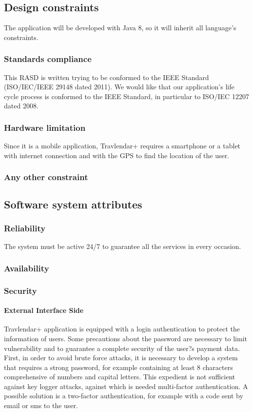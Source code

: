 \documentclass[12pt,titlepage]{article}
\begin{document}
\subsection{Design constraints}\label{sec:mod1}
The application will be developed with Java 8, so it will inherit all language's constraints.

\subsubsection{Standards compliance}\label{sec:mod1}
This RASD is written trying to be conformed to the IEEE Standard (ISO/IEC/IEEE 29148 dated 2011).
We would like that our application's life cycle process is conformed to the IEEE Standard, in particular to ISO/IEC 12207 dated 2008.


\subsubsection{Hardware limitation}\label{sec:mod1}
Since it is a mobile application, Travlendar+ requires a smartphone or a tablet with internet connection and with the GPS to find the location of the user. 

\subsubsection{Any other constraint}\label{sec:mod1}
\subsection{Software system attributes}\label{sec:mod1}
\subsubsection{Reliability}\label{sec:mod1}
The system must be active 24/7 to guarantee all the services in every occasion. 

\subsubsection{Availability}\label{sec:mod1}
\subsubsection{Security}\label{sec:mod1}
\paragraph{External Interface Side} 
Travlendar+ application is equipped with a login authentication to protect the information of users. Some precautions about the password are necessary to limit vulnerability and to guarantee a complete security of the user?s payment data. First, in order to avoid brute force attacks, it is necessary to develop a system that requires a strong password, for example containing at least 8 characters comprehensive of numbers and capital letters. This expedient is not sufficient against key logger attacks, against which is needed multi-factor authentication. A possible solution is a two-factor authentication, for example with a code sent by email or sms to the user. 
\end{document}
